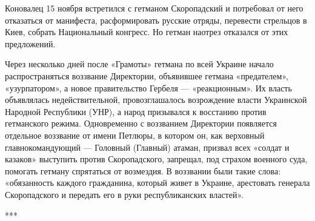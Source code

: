 \begin{itemize}
Коновалец 15 ноября встретился с гетманом Скоропадский и потребовал от него
отказаться от манифеста, расформировать русские отряды, перевести стрельцов в
Киев, собрать Национальный конгресс. Но гетман наотрез отказался от этих
предложений.

Через несколько дней после «Грамоты» гетмана по всей Украине начало
распространяться воззвание Директории, объявившее гетмана «предателем»,
«узурпатором», а новое правительство Гербеля — «реакционным». Их власть
объявлялась недействительной, провозглашалось возрождение власти Украинской
Народной Республики (УНР), а народ призывался к восстанию против гетманского
режима. Одновременно с воззванием Директории появляется отдельное воззвание от
имени Петлюры, в котором он, как верховный главнокомандующий — Головный
(Главный) атаман, призвал всех «солдат и казаков» выступить против
Скоропадского, запрещал, под страхом военного суда, помогать гетману спрятаться
от возмездия. В воззвании были такие слова: «обязанность каждого гражданина,
который живет в Украине, арестовать генерала Скоропадского и передать его в
руки республиканских властей».


***

\end{itemize} %
